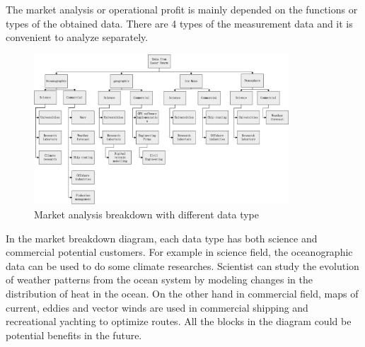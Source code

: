 The market analysis or operational profit is mainly depended on the functions or types of the obtained data. There are 4 types of the measurement data and it is convenient to analyze separately.
\begin{figure} [h]
	\begin{center}
 \includegraphics[width=0.85\textwidth,angle=0]{chapters/img/Market_analysis.jpg}	
	\caption{Market analysis breakdown with different data type}
	\label{MA}
	\end{center}
\end{figure}
In the market breakdown diagram, each data type has both science and commercial potential customers. For example in science field, the oceanographic data can be used to do some climate researches. Scientist can study the evolution of weather patterns from the ocean system by modeling changes in the distribution of heat in the ocean. On the other hand in commercial field, maps of current, eddies and vector winds are used in commercial shipping and recreational yachting to optimize routes. All the blocks in the diagram could be potential benefits in the future.